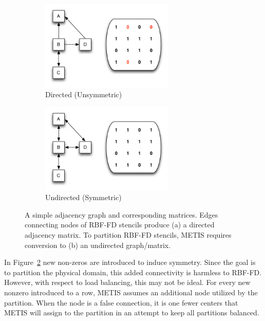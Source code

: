 \documentclass{report}
\begin{document}
\begin{figure}[ht!]
\begin{center}
\begin{subfigure}[b]{0.425\textwidth}
\includegraphics[width=2.5in]{../figures/omnigraffle/DirectedAdjacencyGraph.png}
\caption{Directed (Unsymmetric)}
\label{fig:directed_graph}
\end{subfigure}
\begin{subfigure}[b]{0.425\textwidth}
\includegraphics[width=2.5in]{../figures/omnigraffle/UndirectedAdjacencyGraph.png}
\caption{Undirected (Symmetric)}
\label{fig:undirected_graph}
\end{subfigure}
\caption{A simple adjacency graph and corresponding matrices. Edges connecting nodes of RBF-FD stencils produce (a) a directed adjacency matrix. To partition RBF-FD stencils, METIS requires conversion to (b) an undirected graph/matrix.}
\label{fig:adjacency_matrix}
\end{center}
\end{figure}

In Figure~\ref{fig:undirected_graph} new non-zeros are introduced to induce symmetry. Since the goal is to partition the physical domain, this added connectivity is harmless to RBF-FD. However, with respect to load balancing, this may not be ideal. For every new nonzero introduced to a row, METIS assumes an additional node utilized by the partition. When the node is a false connection, it is one fewer centers that METIS will assign to the partition in an attempt to keep all partitions balanced. 
\end{document}

